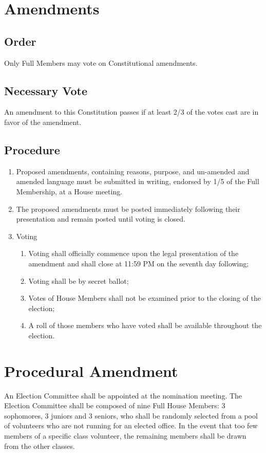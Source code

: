 \documentclass[10pt]{article} %
\begin{document}
\section{Amendments}
\subsection{Order}
Only Full Members may vote on Constitutional amendments.
\subsection{Necessary Vote}
An amendment to this Constitution passes if at least 2/3 of the votes cast are in favor of the amendment.
\subsection{Procedure}
\begin{enumerate}
\item Proposed amendments, containing reasons, purpose, and un-amended and amended language must be submitted in writing, endorsed by 1/5 of the Full Membership, at a House meeting.
\item The proposed amendments must be posted immediately following their presentation and remain posted until voting is closed.
\item Voting
\begin{enumerate}
\item Voting shall officially commence upon the legal presentation of the amendment and shall close at 11:59 PM on the seventh day following;
\item Voting shall be by secret ballot;
\item Votes of House Members shall not be examined prior to the closing of the election;
\item A roll of those members who have voted shall be available throughout the election.
\end{enumerate}
\end{enumerate}

\pagebreak
\appendix
\section{Procedural Amendment}
An Election Committee shall be appointed at the nomination meeting. The Election Committee shall be composed of nine Full House Members: 3 sophomores, 3 juniors and 3 seniors, who shall be randomly selected from a pool of volunteers who are not running for an elected office. In the event that too few members of a specific class volunteer, the remaining members shall be drawn from the other classes.
\end{document}
